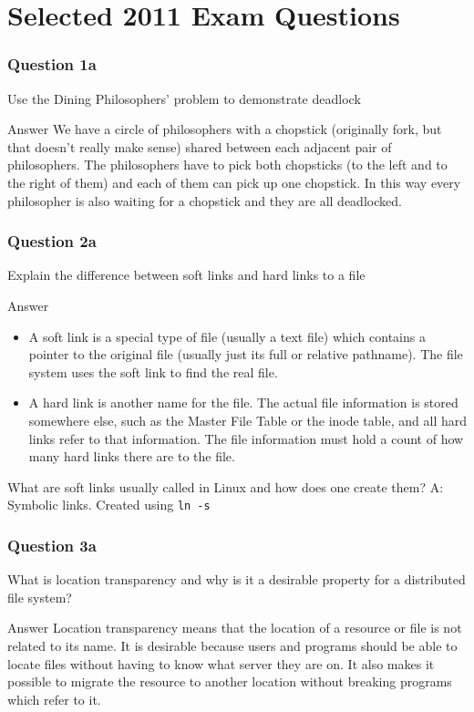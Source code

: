 \documentclass{beamer}
\begin{document}
\section{Selected 2011 Exam Questions}
\begin{frame}
  \frametitle{Question 1a}
  Use the Dining Philosophers' problem to demonstrate deadlock
  \pause
  \begin{block}{Answer}
    We have a circle of philosophers with a chopstick (originally fork, but that doesn't really make sense) shared between each adjacent pair of philosophers. The philosophers have to pick both chopsticks (to the left and to the right of them) and each of them can pick up one chopstick. In this way every philosopher is also waiting for a chopstick and they are all deadlocked.
  \end{block}
\end{frame}
\begin{frame}
  \frametitle{Question 2a}
  Explain the difference between soft links and hard links to a file
  \pause
  \begin{block}{Answer}
    \begin{itemize}
      \item A soft link is a special type of file (usually a text file) which contains a pointer to the original file (usually just its full or relative pathname). The file system uses the soft link to find the real file.
      \item A hard link is another name for the file. The actual file information is stored somewhere else, such as the Master File Table or the inode table, and all hard links refer to that information. The file information must hold a count of how many hard links there are to the file.
    \end{itemize}
  \end{block}
  What are soft links usually called in Linux and how does one create them?
  \pause
  A: Symbolic links. Created using \texttt{ln -s}
\end{frame}
\begin{frame}
  \frametitle{Question 3a}
  What is location transparency and why is it a desirable property for a distributed file system?
  \pause
  \begin{block}{Answer}
    Location transparency means that the location of a resource or file is not related to its name. It is desirable because users and programs should be able to locate files without having to know what server they are on. It also makes it possible to migrate the resource to another location without breaking programs which refer to it.
  \end{block}
\end{frame}
\end{document}
